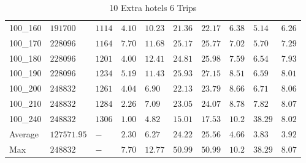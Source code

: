 \begin{center}
\begin{table}[]
\begin{tabular}{|lll|l|l|ll|lll|}
100\_160 & $191700   $ & $1114$ & $4.10$ & $10.23$  & $21.36$    & $22.17$   & $6.38$ & $5.14 $  & $6.26$ \\
100\_170 & $228096   $ & $1164$ & $7.70$ & $11.68$  & $25.17$    & $25.77$   & $7.02$ & $5.70 $  & $7.29$ \\
100\_180 & $228096   $ & $1201$ & $4.00$ & $12.41$  & $24.81$    & $25.98$   & $7.59$ & $6.54 $  & $7.93$ \\
100\_190 & $228096   $ & $1234$ & $5.19$ & $11.43$  & $25.93$    & $27.15$   & $8.51$ & $6.59 $  & $8.01$ \\
100\_200 & $248832   $ & $1261$ & $4.04$ & $6.90 $  & $22.13$    & $23.79$   & $8.66$ & $6.71 $  & $8.06$ \\
100\_210 & $248832   $ & $1284$ & $2.26$ & $7.09 $  & $23.05$    & $24.07$   & $8.78$ & $7.82 $  & $8.07$ \\
100\_240 & $248832   $ & $1306$ & $1.00$ & $4.82 $  & $15.01$    & $17.53$   & $10.2$ &3$ 8.29$  & $8.02$ \\
\hline
Average  & $127571.95$ & $-   $ & $2.30$ & $6.27 $  & $24.22$    & $25.56$   & $4.66$ & $3.83 $  & $3.92$ \\
Max      & $248832   $ & $-   $ & $7.70$ & $12.77$  & $50.99$    & $50.99$   & $10.2$ &3$ 8.29$  & $8.07$ \\
\hline
\end{tabular}
\caption{10 Extra hotels 6 Trips}
\label{10-6}
\end{table}
\end{center}
